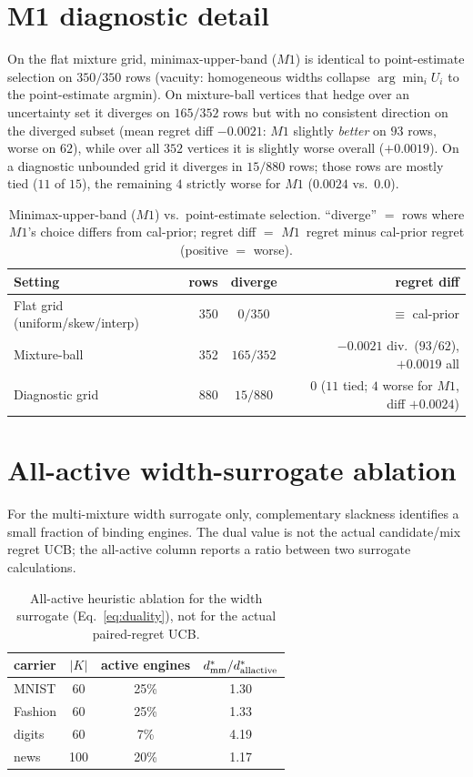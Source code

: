 \documentclass{article}
\begin{document}
\section{M1 diagnostic detail}
\label{app:m1}
On the flat mixture grid, minimax-upper-band ($M1$) is identical to point-estimate selection
on $350/350$ rows (vacuity: homogeneous widths collapse $\arg\min_i U_i$ to the point-estimate
argmin). On mixture-ball vertices that hedge over an uncertainty set it diverges on $165/352$
rows but with no consistent direction on the diverged subset (mean regret diff $-0.0021$:
$M1$ slightly \emph{better} on $93$ rows, worse on $62$), while over all $352$ vertices it is
slightly worse overall ($+0.0019$). On a diagnostic unbounded grid it diverges in $15/880$
rows; those rows are mostly tied ($11$ of $15$), the remaining $4$ strictly worse for $M1$
($0.0024$ vs.\ $0.0$).

\begin{table}[h]
\centering\small
\begin{tabular}{lrcr}
\toprule
Setting & rows & diverge & regret diff \\
\midrule
Flat grid (uniform/skew/interp) & 350 & $0/350$ & $\equiv$ cal-prior \\
Mixture-ball & 352 & $165/352$ & $-0.0021$ div.\ ($93$/$62$), $+0.0019$ all \\
Diagnostic grid & 880 & $15/880$ & $0$ ($11$ tied; $4$ worse for $M1$, diff $+0.0024$) \\
\bottomrule
\end{tabular}
\caption{Minimax-upper-band ($M1$) vs.\ point-estimate selection. ``diverge'' $=$ rows where
$M1$'s choice differs from cal-prior; regret diff $=$ $M1$~regret minus cal-prior regret
(positive $=$ worse).}
\label{tab:m1}
\end{table}

\section{All-active width-surrogate ablation}
\label{app:m35}
For the multi-mixture width surrogate only, complementary slackness identifies a small fraction
of binding engines. The dual value is not the actual candidate/mix regret UCB; the all-active
column reports a ratio between two surrogate calculations.
\begin{table}[h]
\centering\small\setlength{\tabcolsep}{4pt}
\begin{tabular}{lccc}
\toprule
carrier & $|K|$ & active engines & $d^*_{\rm mm}/d^*_{\rm allactive}$ \\
\midrule
MNIST & 60 & 25\% & 1.30 \\
Fashion & 60 & 25\% & 1.33 \\
digits & 60 & 7\% & 4.19 \\
news & 100 & 20\% & 1.17 \\
\bottomrule
\end{tabular}
\caption{All-active heuristic ablation for the width surrogate (Eq.~\ref{eq:duality}), not
for the actual paired-regret UCB.}
\label{tab:m35ab}
\end{table}
\end{document}
